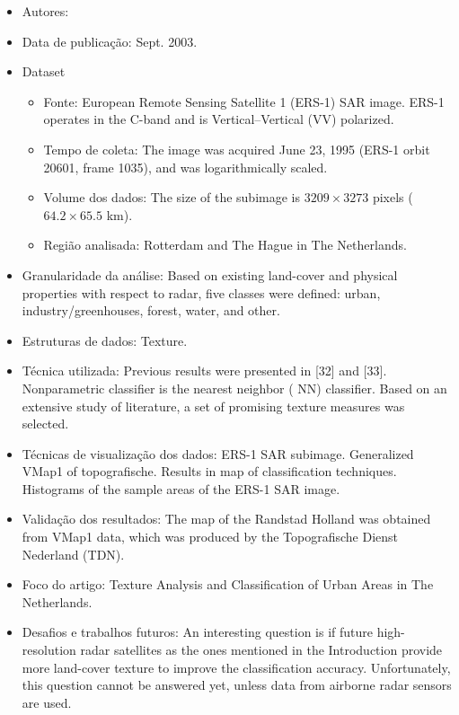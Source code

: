 \documentclass[paper=a4, fontsize=11pt]{scrartcl}
\begin{document}
\begin{itemize}
    \item Autores:~\cite{dekker2003texture}
    \item Data de publicação: Sept. 2003.
    \item Dataset
    \begin{itemize}
        \item Fonte: European Remote Sensing Satellite 1 (ERS-1) SAR image. ERS-1 operates in the C-band and is Vertical–Vertical (VV) polarized.
        \item Tempo de coleta: The image was acquired June 23, 1995 (ERS-1 orbit 20601, frame 1035), and was logarithmically scaled.
        \item Volume dos dados: The size of the subimage is $3209 \times 3273$ pixels ($64.2 \times 65.5$ km).
        \item Região analisada: Rotterdam and The Hague in The Netherlands.
    \end{itemize}
    \item Granularidade da análise: Based on existing land-cover and physical properties with respect to radar, five classes were defined: urban, industry/greenhouses, forest, water, and other. 
    \item Estruturas de dados: Texture.
    \item Técnica utilizada: Previous results were presented in [32] and [33]. Nonparametric classifier is the nearest neighbor ( NN) classifier. Based on an extensive study of literature, a set of promising texture measures was selected.
    \item Técnicas de visualização dos dados: ERS-1 SAR subimage. Generalized VMap1 of topografische. Results in map of classification techniques. Histograms of the sample areas of the ERS-1 SAR image.
    \item Validação dos resultados: The map of the Randstad Holland was obtained from VMap1 data, which was produced by the Topografische Dienst Nederland (TDN).
    \item Foco do artigo: Texture Analysis and Classification of Urban Areas in The Netherlands.
    \item Desafios e trabalhos futuros: An interesting question is if future high-resolution radar satellites as the ones mentioned in the Introduction provide more land-cover texture to improve the classification accuracy. Unfortunately, this question cannot be answered yet, unless data from airborne radar sensors are used.
\end{itemize}
\end{document}
